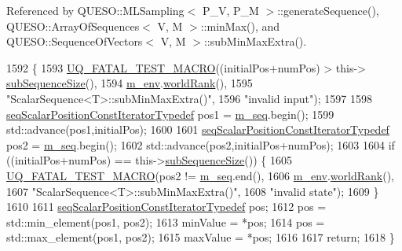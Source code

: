 Referenced by Q\-U\-E\-S\-O\-::\-M\-L\-Sampling$<$ P\-\_\-\-V, P\-\_\-\-M $>$\-::generate\-Sequence(), Q\-U\-E\-S\-O\-::\-Array\-Of\-Sequences$<$ V, M $>$\-::min\-Max(), and Q\-U\-E\-S\-O\-::\-Sequence\-Of\-Vectors$<$ V, M $>$\-::sub\-Min\-Max\-Extra().


\begin{DoxyCode}
1592 \{
1593   \hyperlink{_defines_8h_a56d63d18d0a6d45757de47fcc06f574d}{UQ\_FATAL\_TEST\_MACRO}((initialPos+numPos) > this->
      \hyperlink{class_q_u_e_s_o_1_1_scalar_sequence_a0288ea295eedc216a1617b3286f6f3a0}{subSequenceSize}(),
1594                       \hyperlink{class_q_u_e_s_o_1_1_scalar_sequence_a71618cd6351b29361b437af68447a4c8}{m\_env}.\hyperlink{class_q_u_e_s_o_1_1_base_environment_a78b57112bbd0e6dd0e8afec00b40ffa7}{worldRank}(),
1595                       \textcolor{stringliteral}{"ScalarSequence<T>::subMinMaxExtra()"},
1596                       \textcolor{stringliteral}{"invalid input"});
1597 
1598   \hyperlink{class_q_u_e_s_o_1_1_scalar_sequence_a1a43b88ee86997e3cc9c4f686ac3a359}{seqScalarPositionConstIteratorTypedef} pos1 = 
      \hyperlink{class_q_u_e_s_o_1_1_scalar_sequence_ae616036fd2e62fb69df167814545e893}{m\_seq}.begin();
1599   std::advance(pos1,initialPos);
1600 
1601   \hyperlink{class_q_u_e_s_o_1_1_scalar_sequence_a1a43b88ee86997e3cc9c4f686ac3a359}{seqScalarPositionConstIteratorTypedef} pos2 = 
      \hyperlink{class_q_u_e_s_o_1_1_scalar_sequence_ae616036fd2e62fb69df167814545e893}{m\_seq}.begin();
1602   std::advance(pos2,initialPos+numPos);
1603 
1604   \textcolor{keywordflow}{if} ((initialPos+numPos) == this->\hyperlink{class_q_u_e_s_o_1_1_scalar_sequence_a0288ea295eedc216a1617b3286f6f3a0}{subSequenceSize}()) \{
1605     \hyperlink{_defines_8h_a56d63d18d0a6d45757de47fcc06f574d}{UQ\_FATAL\_TEST\_MACRO}(pos2 != \hyperlink{class_q_u_e_s_o_1_1_scalar_sequence_ae616036fd2e62fb69df167814545e893}{m\_seq}.end(),
1606                         \hyperlink{class_q_u_e_s_o_1_1_scalar_sequence_a71618cd6351b29361b437af68447a4c8}{m\_env}.\hyperlink{class_q_u_e_s_o_1_1_base_environment_a78b57112bbd0e6dd0e8afec00b40ffa7}{worldRank}(),
1607                         \textcolor{stringliteral}{"ScalarSequence<T>::subMinMaxExtra()"},
1608                         \textcolor{stringliteral}{"invalid state"});
1609   \}
1610 
1611   \hyperlink{class_q_u_e_s_o_1_1_scalar_sequence_a1a43b88ee86997e3cc9c4f686ac3a359}{seqScalarPositionConstIteratorTypedef} pos;
1612   pos = std::min\_element(pos1, pos2);
1613   minValue = *pos;
1614   pos = std::max\_element(pos1, pos2);
1615   maxValue = *pos;
1616 
1617   \textcolor{keywordflow}{return};
1618 \}
\end{DoxyCode}
